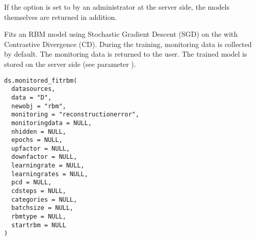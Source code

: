 %
\begin{Details}\relax
If the option  is set to 
by an administrator at the server side, the models themselves are returned in addition.
\end{Details}
%
\begin{Description}\relax
Fits an RBM model using Stochastic Gradient Descent (SGD) on the 
with Contrastive Divergence (CD).
During the training, monitoring data is collected by default.
The monitoring data is returned to the user.
The trained model is stored on the server side (see parameter ).
\end{Description}
%
\begin{Usage}
\begin{verbatim}
ds.monitored_fitrbm(
  datasources,
  data = "D",
  newobj = "rbm",
  monitoring = "reconstructionerror",
  monitoringdata = NULL,
  nhidden = NULL,
  epochs = NULL,
  upfactor = NULL,
  downfactor = NULL,
  learningrate = NULL,
  learningrates = NULL,
  pcd = NULL,
  cdsteps = NULL,
  categories = NULL,
  batchsize = NULL,
  rbmtype = NULL,
  startrbm = NULL
)
\end{verbatim}
\end{Usage}
%
